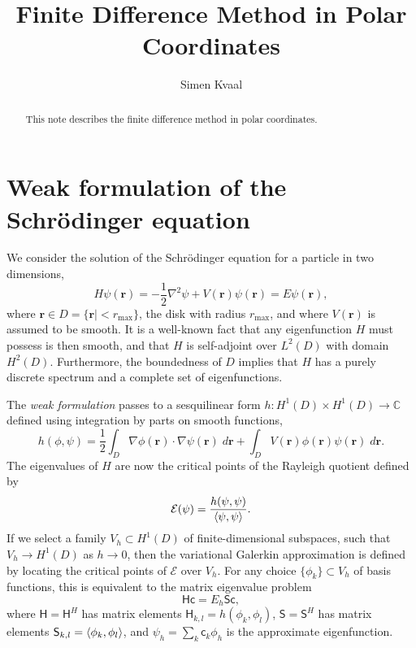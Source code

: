 \documentclass{article}
\newcommand{\CC}{\mathbb{C}}
\begin{document}

\title{Finite Difference Method in Polar Coordinates}
\author{Simen Kvaal}

\begin{abstract}
This note describes the finite difference method in polar coordinates.
\end{abstract}

\maketitle


\section{Weak formulation of the Schr\"odinger equation}

We consider the solution of the Schr\"odinger equation for a particle in two dimensions,
\begin{equation}
    H\psi(\mathbf{r}) = -\frac{1}{2} \nabla^2 \psi + V(\mathbf{r}) \psi(\mathbf{r}) = E \psi(\mathbf{r}),
\end{equation}
where $\mathbf{r} \in D = \{ \mathbf{r}| < r_\text{max} \}$, the disk with radius $r_\text{max}$, and where $V(\mathbf{r})$ is assumed to be smooth. It is a well-known fact that any eigenfunction $H$ must possess is then smooth, and that $H$ is self-adjoint over $L^2(D)$ with domain $H^2(D)$. Furthermore, the boundedness of $D$ implies that $H$ has a purely discrete spectrum and a complete set of eigenfunctions.

The \emph{weak formulation} passes to a sesquilinear form $h : H^1(D)\times H^1(D) \to \CC$ defined using integration by parts on smooth functions,
\begin{equation}
    h(\phi,\psi) = \frac{1}{2} \int_D \nabla \phi(\mathbf{r}) \cdot \nabla \psi(\mathbf{r}) \; d\mathbf{r} + \int_D V(\mathbf{r}) \phi(\mathbf{r}) \psi(\mathbf{r}) \; d\mathbf{r}.
\end{equation}
The eigenvalues of $H$ are now the critical points of the Rayleigh quotient defined by
\begin{equation}
    \mathcal{E}(\psi) = \frac{h(\psi,\psi)}{\braket{\psi,\psi}}.
\end{equation}
If we select a family $V_h \subset H^1(D)$ of finite-dimensional subspaces, such that $V_h \to H^1(D)$ as $h\to 0$, then the variational Galerkin approximation is defined by locating the critical points of $\mathcal{E}$ over $V_h$. For any choice $\{\phi_k\}\subset V_h$ of basis functions, this is equivalent to the matrix eigenvalue problem
\begin{equation}
    \mathsf{H} \mathsf{c} = E_h \mathsf{S} \mathsf{c},
\end{equation}
where $\mathsf{H} = \mathsf{H}^H$ has matrix elements $\mathsf{H}_{k,l} = h(\phi_k,\phi_l)$, $\mathsf{S} = \mathsf{S}^H$ has matrix elements $\mathsf{S}_{k,l} = \braket{\phi_k,\phi_l}$, and $\psi_h = \sum_k \mathsf{c}_k \phi_h$ is the approximate eigenfunction.
\end{document}
